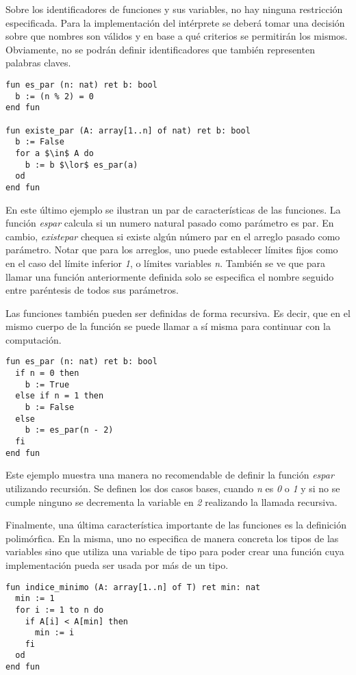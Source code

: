 \documentclass{article}
\begin{document}
Sobre los identificadores de funciones y sus variables, no hay ninguna restricción especificada.
Para la implementación del intérprete se deberá tomar una decisión sobre que nombres son válidos y en base a qué criterios se permitirán los mismos.
Obviamente, no se podrán definir identificadores que también representen palabras claves.

\begin{lstlisting}
fun es_par (n: nat) ret b: bool
  b := (n % 2) = 0
end fun

fun existe_par (A: array[1..n] of nat) ret b: bool
  b := False
  for a $\in$ A do
    b := b $\lor$ es_par(a)
  od
end fun
\end{lstlisting}

En este último ejemplo se ilustran un par de características de las funciones.
La función \textit{es\gbajo par} calcula si un numero natural pasado como parámetro es par.
En cambio, \textit{existe\gbajo par} chequea si existe algún número par en el arreglo pasado como parámetro.
Notar que para los arreglos, uno puede establecer límites fijos como en el caso del límite inferior \textit{1}, o límites variables \textit{n}.
También se ve que para llamar una función anteriormente definida solo se especifica el nombre seguido entre paréntesis de todos sus parámetros.

Las funciones también pueden ser definidas de forma recursiva.
Es decir, que en el mismo cuerpo de la función se puede llamar a sí misma para continuar con la computación.

\begin{lstlisting}
fun es_par (n: nat) ret b: bool
  if n = 0 then
    b := True
  else if n = 1 then
    b := False
  else
    b := es_par(n - 2)
  fi
end fun
\end{lstlisting}

Este ejemplo muestra una manera no recomendable de definir la función \textit{es\gbajo par} utilizando recursión.
Se definen los dos casos bases, cuando \textit{n} es \textit{0} o \textit{1} y si no se cumple ninguno se decrementa la variable en \textit{2} realizando la llamada recursiva.

Finalmente, una última característica importante de las funciones es la definición polimórfica.
En la misma, uno no especifica de manera concreta los tipos de las variables sino que utiliza una variable de tipo para poder crear una función cuya implementación pueda ser usada por más de un tipo.

\begin{lstlisting}
fun indice_minimo (A: array[1..n] of T) ret min: nat
  min := 1
  for i := 1 to n do
    if A[i] < A[min] then
      min := i
    fi
  od
end fun
\end{lstlisting}
\end{document}
